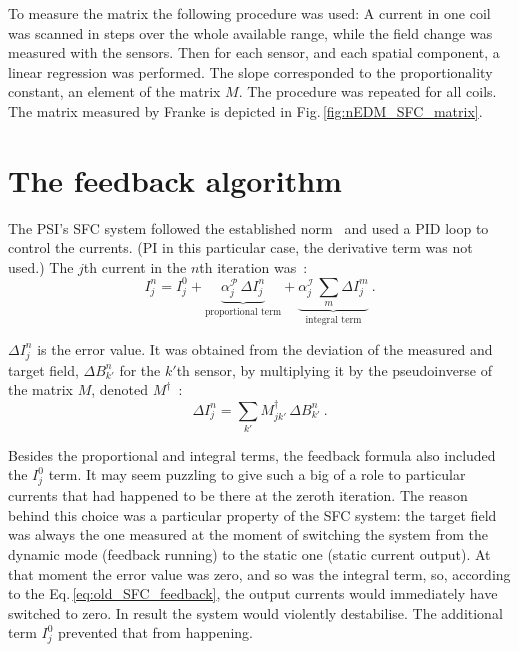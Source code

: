 To measure the matrix the following procedure was used: A current in one coil was scanned in steps over the whole available range, while the field change was measured with the sensors. Then for each sensor, and each spatial component, a linear regression was performed. The slope corresponded to the proportionality constant, an element of the matrix $M$. The procedure was repeated for all coils. The matrix measured by Franke is depicted in Fig.\,\ref{fig:nEDM_SFC_matrix}.




\section{The feedback algorithm}
The PSI's SFC system followed the established norm~\cite{Kelha1982,Brake1991,Spemann2003,Brys2005} and used a PID loop to control the currents. (PI in this particular case, the derivative term was not used.) The $j$th current in the $n$th iteration was~\cite{Franke2013}:
\begin{equation}
  \label{eq:old_SFC_feedback}
  I^n_j = I^0_j +
    \underbrace{ \alpha^\mathcal{P}_j \, \Delta I^n_j }_\text{proportional term} +
    \underbrace{ \alpha^\mathcal{I}_j \, \sum_m \Delta I^m_j }_\text{integral term} \ .
\end{equation}

$\Delta I^n_j$ is the error value. It was obtained from the deviation of the measured and target field, $\Delta B^n_{k'}$ for the $k'$th sensor, by multiplying it by the pseudoinverse of the matrix $M$, denoted $M^\dagger$~\cite{Franke2013}:
\begin{equation}
  \Delta I^n_j = \sum_{k'} M^\dagger_{jk'} \, \Delta B^n_{k'} \ .
\end{equation}

Besides the proportional and integral terms, the feedback formula also included the $I^0_j$ term. It may seem puzzling to give such a big of a role to particular currents that had happened to be there at the zeroth iteration. The reason behind this choice was a particular property of the SFC system: the target field was always the one measured at the moment of switching the system from the dynamic mode (feedback running) to the static one (static current output).
At that moment the error value was zero, and so was the integral term, so, according to the Eq.\,\ref{eq:old_SFC_feedback}, the output currents would immediately have switched to zero. In result the system would violently destabilise. The additional term $I^0_j$ prevented that from happening.

